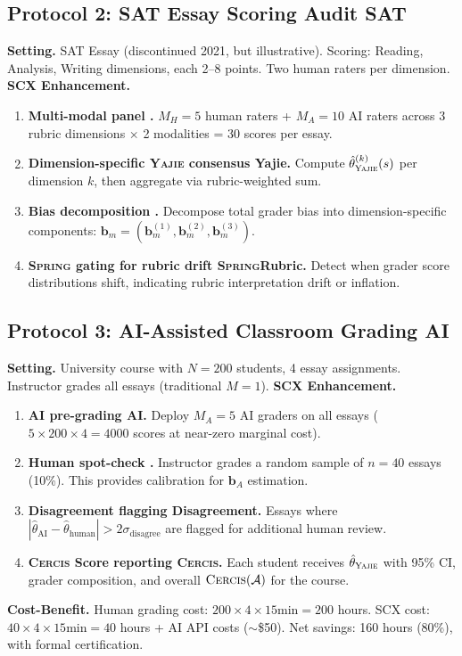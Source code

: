 \documentclass[11pt,a4paper]{article}
\theoremstyle{definition}
\theoremstyle{remark}
\newcommand{\Yajie}{\textsc{Yajie}}
\newcommand{\Cercis}{\textsc{Cercis}}
\newcommand{\Spring}{\textsc{Spring}}
\newcommand{\cA}{\mathcal{A}}
\newcommand{\biasVec}{\mathbf{b}}
\begin{document}
\subsection{Protocol 2: SAT Essay Scoring Audit SAT}
\textbf{Setting.} SAT Essay (discontinued 2021, but illustrative). Scoring: Reading, Analysis, Writing dimensions, each 2--8 points. Two human raters per dimension.
\textbf{SCX Enhancement.}
\begin{enumerate}[label=Step \arabic*:, nosep]
    \item \textbf{Multi-modal panel .} $M_H = 5$ human raters + $M_A = 10$ AI raters across 3 rubric dimensions $\times$ 2 modalities = 30 scores per essay.
    \item \textbf{Dimension-specific \Yajie{} consensus Yajie.} Compute $\hat{\theta}_{\Yajie}^{(k)}(s)$ per dimension $k$, then aggregate via rubric-weighted sum.
    \item \textbf{Bias decomposition .} Decompose total grader bias into dimension-specific components: $\biasVec_m = (\biasVec_m^{(1)}, \biasVec_m^{(2)}, \biasVec_m^{(3)})$.
    \item \textbf{\Spring{} gating for rubric drift \Spring{}Rubric.} Detect when grader score distributions shift, indicating rubric interpretation drift or inflation.
\end{enumerate}
\subsection{Protocol 3: AI-Assisted Classroom Grading AI}
\textbf{Setting.} University course with $N=200$ students, 4 essay assignments. Instructor grades all essays (traditional $M=1$).
\textbf{SCX Enhancement.}
\begin{enumerate}[label=Step \arabic*:, nosep]
    \item \textbf{AI pre-grading AI.} Deploy $M_A = 5$ AI graders on all essays ($5 \times 200 \times 4 = 4000$ scores at near-zero marginal cost).
    \item \textbf{Human spot-check .} Instructor grades a random sample of $n = 40$ essays (10\%). This provides calibration for $\biasVec_A$ estimation.
    \item \textbf{Disagreement flagging Disagreement.} Essays where $|\hat{\theta}_{\text{AI}} - \hat{\theta}_{\text{human}}| > 2\sigma_{\text{disagree}}$ are flagged for additional human review.
    \item \textbf{\Cercis{} Score reporting \Cercis{}.} Each student receives $\hat{\theta}_{\Yajie}$ with 95\% CI, grader composition, and overall $\Cercis(\cA)$ for the course.
\end{enumerate}
\textbf{Cost-Benefit.} Human grading cost: $200 \times 4 \times 15\text{min} = 200$ hours. SCX cost: $40 \times 4 \times 15\text{min} = 40$ hours + AI API costs ($\sim$\$50). Net savings: 160 hours (80\%), with formal certification.
\end{document}
